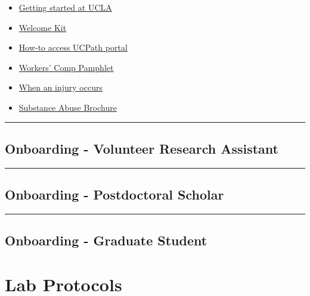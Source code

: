 \documentclass[]{book}
\providecommand{\tightlist}{%
  \setlength{\itemsep}{0pt}\setlength{\parskip}{0pt}}
\begin{document}
\begin{itemize}
\tightlist
\item
  \href{https://www.chr.ucla.edu/new-employee/getting-started}{Getting started at UCLA}
\item
  \href{https://ucnet.universityofcalifornia.edu/forms/pdf/welcome-kit.pdf}{Welcome Kit}
\item
  \href{https://www.centralresourceunit.ucla.edu/s/}{How-to access UCPath portal}
\item
  \href{https://ucla.app.box.com/s/jyzoag8v9qw6katuvgegjil8an2tsx2j}{Workers' Comp
  Pamphlet}
\item
  \href{https://ucla.app.box.com/s/nua4ypfpjlt1226fusney4zyvo6qzzhj}{When an injury occurs}
\item
  \href{https://ucla.app.box.com/s/qrj4j7bnca1r8fy9n1bdfdf6orf1g0dq}{Substance Abuse Brochure}
\end{itemize}

\begin{center}\rule{0.5\linewidth}{\linethickness}\end{center}

\hypertarget{onboarding---volunteer-research-assistant}{%
\section{Onboarding - Volunteer Research Assistant}\label{onboarding---volunteer-research-assistant}}

\begin{center}\rule{0.5\linewidth}{\linethickness}\end{center}

\hypertarget{onboarding---postdoctoral-scholar}{%
\section{Onboarding - Postdoctoral Scholar}\label{onboarding---postdoctoral-scholar}}

\begin{center}\rule{0.5\linewidth}{\linethickness}\end{center}

\hypertarget{onboarding---graduate-student}{%
\section{Onboarding - Graduate Student}\label{onboarding---graduate-student}}

\hypertarget{lab-protocols}{%
\chapter{Lab Protocols}\label{lab-protocols}}
\end{document}
